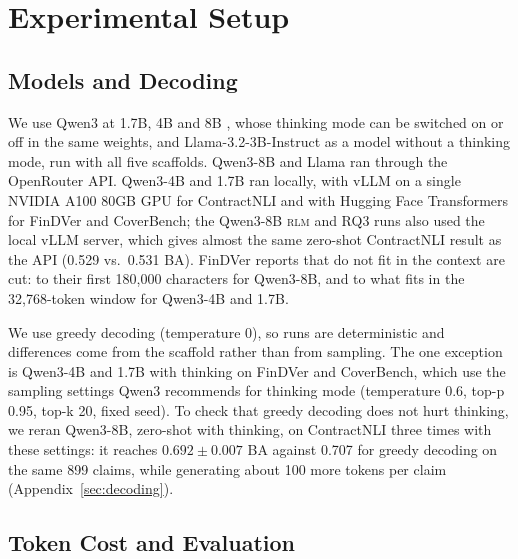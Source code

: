 \documentclass[11pt]{article}
\begin{document}
\section{Experimental Setup}
\label{sec:setup}

\subsection{Models and Decoding}
\label{sec:models}

We use Qwen3 at 1.7B, 4B and 8B \citep{yang2025qwen3}, whose thinking mode
can be switched on or off in the same weights, and Llama-3.2-3B-Instruct
\citep{grattafiori2024llama3} as a model without a thinking mode, run with
all five scaffolds. Qwen3-8B and Llama ran through the OpenRouter API.
Qwen3-4B and 1.7B ran locally, with vLLM \citep{kwon2023vllm} on a single
NVIDIA A100 80GB GPU for ContractNLI and with Hugging Face Transformers
\citep{wolf2020transformers} for FinDVer and CoverBench; the Qwen3-8B \textsc{rlm} and
RQ3 runs also used the local vLLM server, which gives almost the same
zero-shot ContractNLI result as the API (0.529 vs.\ 0.531 BA).
FinDVer reports that do not fit in the context are cut: to their first
180,000 characters for Qwen3-8B, and to what fits in the 32,768-token
window for Qwen3-4B and 1.7B.

We use greedy decoding (temperature 0), so runs are deterministic and
differences come from the scaffold rather than from sampling. The one
exception is Qwen3-4B and 1.7B with thinking on FinDVer and CoverBench,
which use the
sampling settings Qwen3 recommends for thinking mode (temperature 0.6,
top-p 0.95, top-k 20, fixed seed). To check that greedy decoding does not
hurt thinking, we reran Qwen3-8B, zero-shot with thinking, on ContractNLI
three times with these settings: it reaches $0.692\pm0.007$ BA against
0.707 for greedy decoding on the same 899 claims, while generating about
100 more tokens per claim (Appendix~\ref{sec:decoding}).

\subsection{Token Cost and Evaluation}
\label{sec:metrics}
\end{document}
